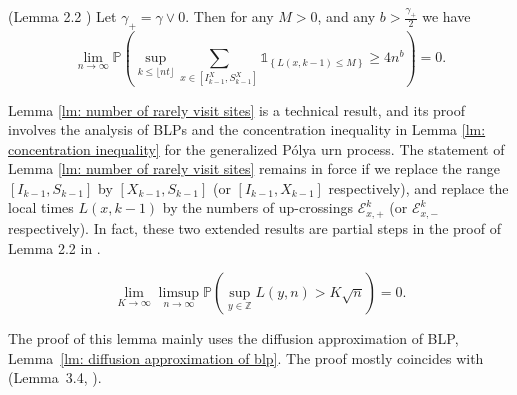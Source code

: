 \documentclass[EJP]{ejpecp} %
\begin{document}
\begin{lemma}(Lemma 2.2 \cite{KMP23})\label{lm: number of rarely visit sites}
	Let $\gamma_+ = \gamma \vee 0$. Then for any $M>0$, and any $b>\frac{\gamma_+}{2}$ we have
	\[
	\lim_{n\to\infty} \mathbb{P}\left(\sup_{k\leq\lfloor nt \rfloor}  \sum_{x\in [I^X_{k-1}, S^X_{k-1}]} \mathbb{1}_{\left\{ L(x,k-1) \leq M \right\}} \geq 4n^b \right) = 0.
	\]
	
\end{lemma}	
Lemma \ref{lm: number of rarely visit sites} is a technical result, and its proof involves the analysis of BLPs and the concentration inequality in Lemma \ref{lm: concentration inequality} for the generalized P\'{o}lya urn process. The statement of Lemma \ref{lm: number of rarely visit sites} remains in force if we replace the range $[I_{k-1}, S_{k-1}]$ by $[X_{k - 1},S_{k - 1}]$ (or $[I_{k-1},X_{k - 1}]$ respectively), and replace the local times $L(x,k-1)$ by the numbers of up-crossings $\mathcal{E}^{k}_{x,+}$ (or $\mathcal{E}^{k}_{x,-}$ respectively). In fact, these two extended results are partial steps in the proof of Lemma 2.2 in \cite{KMP23}.   

\begin{lemma}
	\label{lm: uniform control of local time}
	\[
	\lim_{K \to  \infty } \limsup_{n \to \infty } \mathbb{P}\left( \sup_{y \in \mathbb{Z}} L\left( y, n \right) > K \sqrt{n}  \right) = 0
	.\] 
\end{lemma}
The proof of this lemma mainly uses the diffusion approximation of BLP, Lemma~\ref{lm: diffusion approximation of blp}. The proof mostly coincides with (Lemma~3.4, \cite{KP16}). 
\end{document}
